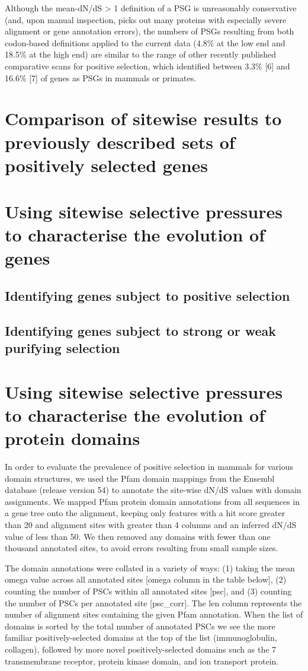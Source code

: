 Although the mean-dN/dS > 1 definition of a PSG is unreasonably
conservative (and, upon manual inspection, picks out many proteins
with especially severe alignment or gene annotation errors), the
numbers of PSGs resulting from both codon-based definitions applied to
the current data (4.8\% at the low end and 18.5\% at the high end) are
similar to the range of other recently published comparative scans for
positive selection, which identified between 3.3\% [6] and 16.6\% [7]
of genes as PSGs in mammals or primates.


\section{Comparison of sitewise results to previously described sets of positively selected genes}

\section{Using sitewise selective pressures to characterise the evolution of genes}
\subsection{Identifying genes subject to positive selection}
\subsection{Identifying genes subject to strong or weak purifying selection}

\section{Using sitewise selective pressures to characterise the evolution of protein domains}

In order to evaluate the prevalence of positive selection in mammals
for various domain structures, we used the Pfam domain mappings from
the Ensembl database (release version 54) to annotate the site-wise
dN/dS values with domain assignments. We mapped Pfam protein domain
annotations from all sequences in a gene tree onto the alignment,
keeping only features with a hit score greater than 20 and alignment
sites with greater than 4 columns and an inferred dN/dS value of less
than 50. We then removed any domains with fewer than one thousand
annotated sites, to avoid errors resulting from small sample sizes.

The domain annotations were collated in a variety of ways: (1) taking
the mean omega value across all annotated sites [omega column in the
  table below], (2) counting the number of PSCs within all annotated
sites [psc], and (3) counting the number of PSCs per annotated site
[psc\_corr]. The len column represents the number of alignment sites
containing the given Pfam annotation. When the list of domains is
sorted by the total number of annotated PSCs we see the more familiar
positively-selected domains at the top of the list (immunoglobulin,
collagen), followed by more novel positively-selected domains such as
the 7 transmembrane receptor, protein kinase domain, and ion transport
protein.

